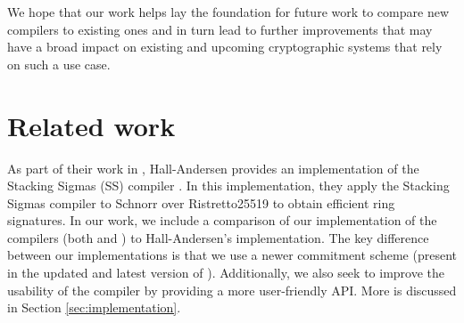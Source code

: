We hope that our work helps lay the foundation for future work to compare 
new compilers to existing ones and in turn lead to further improvements 
that may have a broad impact on existing and upcoming cryptographic systems that rely on such a use case. 

\section{Related work}
\label{sec:related_work}
As part of their work in \cite{StackingSigmas}, Hall-Andersen provides an implementation of the Stacking Sigmas (SS) compiler \cite{MHAStackSig}. 
In this implementation, they apply the Stacking Sigmas compiler to Schnorr over Ristretto25519 to obtain efficient ring signatures. 
In our work, we include a comparison of our implementation of the compilers (both \cite{CDS94} and \cite{StackingSigmas}) to Hall-Andersen's implementation. 
The key difference between our implementations is that we use a newer commitment scheme (present in the updated and latest version of 
\cite{StackingSigmas}). Additionally, we also seek to improve the usability of the compiler by providing a more user-friendly API. 
More is discussed in Section \ref{sec:implementation}.



